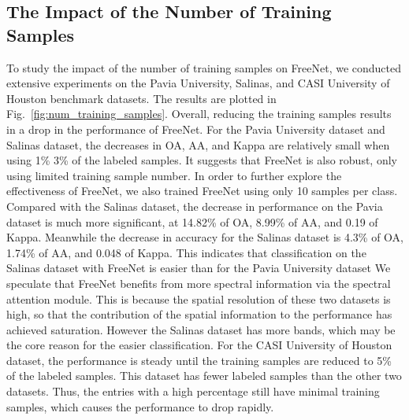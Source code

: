 \documentclass[journal]{IEEEtran}
\begin{document}
\subsection{\textbf{The Impact of the Number of Training Samples}}
To study the impact of the number of training samples on FreeNet, we conducted extensive experiments on the Pavia University, Salinas, and CASI University of Houston benchmark datasets.
The results are plotted in Fig.~\ref{fig:num_training_samples}.
Overall, reducing the training samples results in a drop in the performance of FreeNet. 
For the Pavia University dataset and Salinas dataset, the decreases in OA, AA, and Kappa are relatively small when using 1\%  3\% of the labeled samples.
It suggests that FreeNet is also robust, only using limited training sample number.
In order to further explore the effectiveness of FreeNet, we also trained FreeNet using only 10 samples per class. 
Compared with the Salinas dataset, the decrease in performance on the Pavia dataset is much more significant, at 14.82\% of OA, 8.99\% of AA, and 0.19 of Kappa. 
Meanwhile the decrease in accuracy for the Salinas dataset is 4.3\% of OA, 1.74\% of AA, and 0.048 of Kappa. 
This indicates that classification on the Salinas dataset with FreeNet is easier than for the Pavia University dataset 
We speculate that FreeNet benefits from more spectral information via the spectral attention module. 
This is because the spatial resolution of these two datasets is high, so that the contribution of the spatial information to the performance has achieved saturation. 
However the Salinas dataset has more bands, which may be the core reason for the easier classification. For the CASI University of Houston dataset, the performance is steady until the training samples are reduced to 5\% of the labeled samples. 
This dataset has fewer labeled samples than the other two datasets. 
Thus, the entries with a high percentage still have minimal training samples, which causes the performance to drop rapidly.
\end{document}
